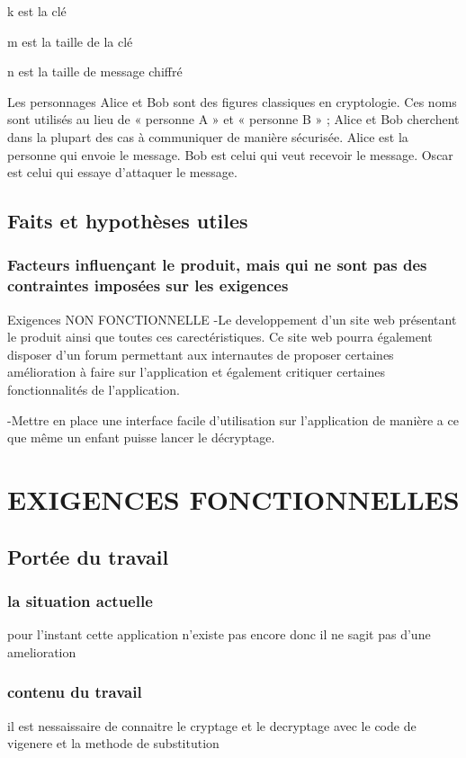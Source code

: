 \documentclass[a4]{article}
\begin{document}
			k est la clé

			m est la taille de la clé

			n est la taille de message chiffré
			
			Les personnages Alice et Bob sont des figures classiques en cryptologie. Ces noms sont utilisés au lieu de « personne A » et « personne B » ; Alice et Bob cherchent dans la plupart des cas à communiquer de manière sécurisée.
			Alice est la personne qui envoie le message.
			Bob est celui qui veut recevoir le message.
			Oscar est celui qui essaye d'attaquer le message.
		\subsection{Faits et hypothèses utiles}	
			\subsubsection{Facteurs influençant le produit, mais qui ne sont pas des contraintes imposées sur les exigences}
			Exigences NON FONCTIONNELLE
				-Le developpement d'un site web présentant le produit ainsi que toutes ces carectéristiques. Ce site web pourra également 
				disposer d'un forum permettant aux internautes de proposer certaines amélioration à faire sur l'application et également 
				critiquer certaines fonctionnalités de l'application.

				-Mettre en place une interface facile d'utilisation sur l'application de manière a ce que même un enfant puisse lancer le décryptage.
	\section{EXIGENCES FONCTIONNELLES}
		\subsection{Portée du travail}
			\subsubsection{la situation actuelle}
				pour l'instant cette application n'existe pas encore 
				donc il ne sagit pas d'une amelioration
			\subsubsection{contenu du travail}
				il est nessaissaire de connaitre le cryptage et le decryptage avec 
				le code de vigenere et la methode de substitution
\end{document}
